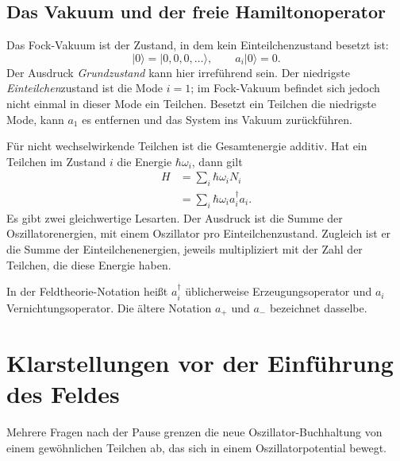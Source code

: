 \subsection{Das Vakuum und der freie Hamiltonoperator}

Das Fock-Vakuum ist der Zustand, in dem kein Einteilchenzustand besetzt ist:
\begin{equation}
|0\rangle=|0,0,0,\ldots\rangle,
\qquad a_i|0\rangle=0.
\end{equation}
Der Ausdruck \emph{Grundzustand} kann hier irreführend sein. Der niedrigste \emph{Einteilchen}zustand ist die Mode \(i=1\); im Fock-Vakuum befindet sich jedoch nicht einmal in dieser Mode ein Teilchen. Besetzt ein Teilchen die niedrigste Mode, kann \(a_1\) es entfernen und das System ins Vakuum zurückführen.

\begin{classroomqa}
\end{classroomqa}

Für nicht wechselwirkende Teilchen ist die Gesamtenergie additiv. Hat ein Teilchen im Zustand \(i\) die Energie \(\hbar\omega_i\), dann gilt
\begin{align}
H
&=\sum_i \hbar\omega_i N_i \\
&=\sum_i \hbar\omega_i a_i^\dagger a_i.
\label{eq:l06-free-fock-hamiltonian}
\end{align}
Es gibt zwei gleichwertige Lesarten. Der Ausdruck ist die Summe der Oszillatorenergien, mit einem Oszillator pro Einteilchenzustand. Zugleich ist er die Summe der Einteilchenenergien, jeweils multipliziert mit der Zahl der Teilchen, die diese Energie haben.

In der Feldtheorie-Notation heißt \(a_i^\dagger\) üblicherweise Erzeugungsoperator und \(a_i\) Vernichtungsoperator. Die ältere Notation \(a_+\) und \(a_-\) bezeichnet dasselbe.

\section{Klarstellungen vor der Einführung des Feldes}

Mehrere Fragen nach der Pause grenzen die neue Oszillator-Buchhaltung von einem gewöhnlichen Teilchen ab, das sich in einem Oszillatorpotential bewegt.

